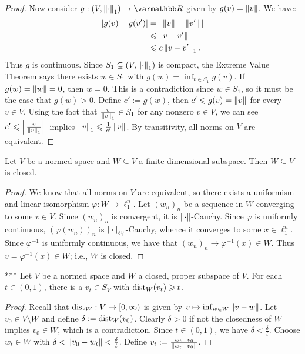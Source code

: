 \begin{proof}
            Now consider $g:(V,\lnorm \cdot \rnorm_1) \rightarrow \bfR$ given by $g(v) = \left\lVert v \right\rVert$. We have:
                \begin{equation*}
                \begin{split}
                    |g(v) - g(v')| 
                    & = | \left\lVert v \right\rVert - \left\lVert v' \right\rVert| \\
                    & \leqslant \left\lVert v - v' \right\rVert \\
                    & \leqslant c \left\lVert v-v' \right\rVert_1.
                \end{split}
                \end{equation*}
            Thus $g$ is continuous. Since $S_1 \subseteq (V,\left\lVert \cdot \right\rVert_1)$ is compact, the Extreme Value Theorem says there exists $w \in S_1$ with $g(w) = \inf_{v \in S_1}g(v)$. If $g(w) = \left\lVert w \right\rVert = 0$, then $w = 0$. This is a contradiction since $w \in S_1$, so it must be the case that $g(w) > 0$. Define $c' := g(w)$, then $c' \leqslant g(v) = \left\lVert v \right\rVert$ for every $v \in V$. Using the fact that $\frac{v}{\left\lVert v \right\rVert_1} \in S_1$ for any nonzero $v \in V$, we can see $c' \leqslant \left\lVert \frac{v}{\left\lVert v \right\rVert_1} \right\rVert $ implies $\left\lVert v \right\rVert_1 \leqslant \frac{1}{c'}\left\lVert v \right\rVert$. By transitivity, all norms on $V$ are equivalent.
        \end{proof}

    \begin{corollary}
        Let $V$ be a normed space and $W \subseteq V$ a finite dimensional subspace. Then $W \subseteq V$ is closed. 
    \end{corollary}
        \begin{proof}
            We know that all norms on $V$ are equivalent, so there exists a uniformism and linear isomorphism $\varphi:W \rightarrow \ell_1^n$. Let $(w_n)_n$ be a sequence in $W$ converging to some $v \in V$. Since $(w_n)_n$ is convergent, it is $\left\lVert \cdot \right\rVert$-Cauchy. Since $\varphi$ is uniformly continuous, $(\varphi(w_n))_n$ is $\left\lVert \cdot \right\rVert_{\ell_1^n}$-Cauchy, whence it converges to some $x \in \ell_1^n$. Since $\varphi^{-1}$ is uniformly continuous, we have that $(w_n)_n \rightarrow \varphi^{-1}(x) \in W$. Thus $v = \varphi^{-1}(x) \in W$; i.e., $W$ is closed.
        \end{proof}

    \begin{lemma}[Riesz]***
        Let $V$ be a normed space and $W$ a closed, proper subspace of $V$. For each $t \in (0,1)$, there is a $v_t \in S_V$ with $\operatorname{dist}_W(v_t) \geqslant t$.
    \end{lemma}
        \begin{proof}
            Recall that $\operatorname{dist}_W:V \rightarrow [0,\infty)$ is given by $v \mapsto \inf_{w \in W}\left\lVert v - w \right\rVert$. Let $v_0 \in V\setminus W$ and define $\delta:= \operatorname{dist}_W(v_0)$. Clearly $\delta > 0$ \textemdash if not the closedness of $W$ implies $v_0 \in W$, which is a contradiction. Since $t \in (0,1)$, we have $\delta < \frac{\delta}{t}$. Choose $w_t \in W$ with $\delta < \left\lVert v_0 - w_t \right\rVert < \frac{\delta}{t}$. Define $v_t := \frac{w_t - v_0}{\left\lVert w_t - v_0 \right\rVert}$.
        \end{proof}


